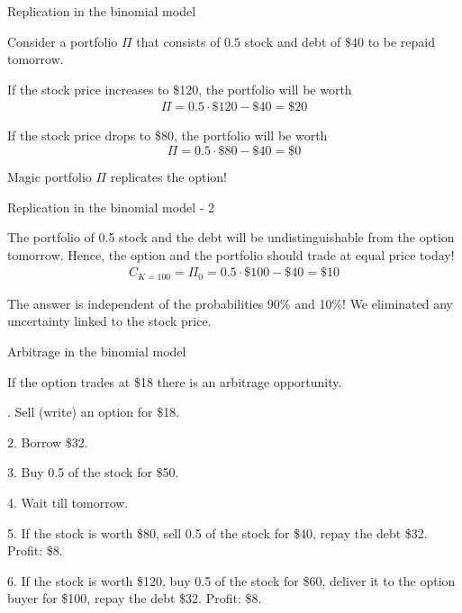 \documentclass{beamer}
\begin{document}
\begin{frame}{Replication in the binomial model}
\centering
{}

\justify
Consider a portfolio $\Pi$ that consists of $0.5$ stock and debt of $\$40$ to be repaid tomorrow.

\justify
If the stock price increases to \$120, the portfolio will be worth
\begin{align*}\Pi = 0.5\cdot\$120 - \$40 = \$20\end{align*}

\justify
If the stock price drops to \$80, the portfolio will be worth
$$\Pi = 0.5 \cdot \$80 - \$40 = \$0$$

\justify
Magic portfolio  $\Pi$ \alert{replicates} the option!
\end{frame}



\begin{frame}{Replication in the binomial model - 2 }
\centering
{}


\justify
The portfolio of 0.5 stock and the debt will be undistinguishable from the option \alert{tomorrow}. Hence, the option and the portfolio should trade at equal price \alert{today}!
\begin{align*}
C_{K=100} = \Pi_0 = 0.5 \cdot \$100 - \$40 = \$10
\end{align*}

\justify
The answer is independent of the probabilities 90\% and 10\%! We eliminated any uncertainty linked to the stock price.
\end{frame}



\begin{frame}{Arbitrage in the binomial model}
\centering
{}

\justify
If the option trades at \$18 there is an arbitrage opportunity.

. Sell (write) an option for \$18.

2. Borrow \$32.

3. Buy 0.5 of the stock for \$50.

4. Wait till tomorrow.

5. If the stock is worth \$80, sell 0.5 of the stock for \$40, repay the debt \$32. Profit: \$8.

6. If the stock is worth \$120, buy 0.5 of the stock for \$60, deliver it to the option buyer for \$100, repay the debt \$32. Profit: \$8.
\end{frame}
\end{document}
